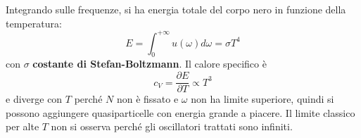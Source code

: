 \documentclass[10pt, a4paper]{scrartcl}
\numberwithin{equation}{subsection}
\theoremstyle{style1}
\begin{document}
Integrando sulle frequenze, si ha energia totale del corpo nero in funzione della temperatura:
\begin{equation}
	E = \int_{0} ^{+\infty} u(\omega) d\omega = \sigma T^4
\end{equation}
con $\sigma $ \textbf{costante di Stefan-Boltzmann}. Il calore specifico \`e 
\begin{equation}
	c_ V = \frac{\partial E}{\partial T} \propto T^3		
\end{equation}
e diverge con $T$  perch\'e $N$ non \`e fissato e $\omega$ non ha limite superiore, quindi si possono aggiungere quasiparticelle con energia grande a piacere. 
Il limite classico per alte $T$ non si osserva perch\'e gli oscillatori trattati sono infiniti.
\end{document}
